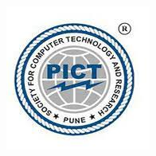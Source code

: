 \documentclass[a4paper, 12pt]{article}
\begin{document}
\pagebreak
\begin{titlepage}
\begin{center}

\begin{figure}[ht!]
\begin{center}
\includegraphics[scale=0.6]{logo.jpg}
\end{center}
\label{overflow}
\end{figure}


\end{center}
\end{titlepage}
\end{document}
